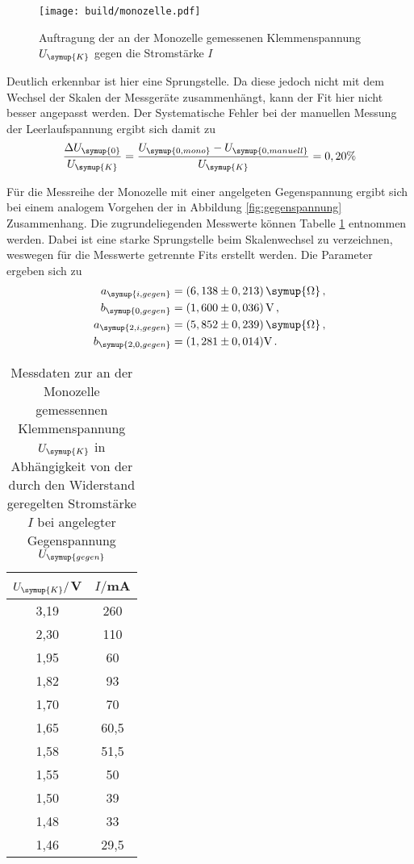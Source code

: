 \begin{figure}
  \centering
  \texttt{[image: build/monozelle.pdf]}
  \caption{Auftragung der an der Monozelle gemessenen Klemmenspannung $U_{\symup{K}}$
  gegen die Stromstärke $I$}
  \label{fig:monozelle}
\end{figure}

Deutlich erkennbar ist hier eine Sprungstelle. Da diese jedoch nicht mit dem Wechsel
der Skalen der Messgeräte zusammenhängt, kann der Fit hier nicht besser angepasst
werden.
Der Systematische Fehler bei der manuellen Messung der Leerlaufspannung ergibt
sich damit zu
\begin{equation}
  \frac{\Delta U_{\symup{0}}}{U_\symup{K}}=\frac{U_{\symup{0,mono}}-U_{\symup{0,manuell}}}
  {U_\symup{K}} = 0,20\%
\end{equation}

Für die Messreihe der Monozelle mit einer angelgeten Gegenspannung ergibt sich
bei einem analogem Vorgehen der in Abbildung \ref{fig:gegenspannung} Zusammenhang.
Die zugrundeliegenden Messwerte können Tabelle \ref{tab:gegenspannung} entnommen werden.
Dabei ist eine starke Sprungstelle beim Skalenwechsel zu verzeichnen, weswegen für
die Messwerte getrennte Fits erstellt werden. Die Parameter ergeben sich zu
\begin{align}
  a_{\symup{i,gegen}}&=(6,138\pm0,213)\,\symup{\Omega}\,,\\
  b_{\symup{0,gegen}}&=(1,600\pm0,036)\,\text{V}\,,\\
  a_{\symup{2,i,gegen}}&=(5,852\pm0,239)\,\symup{\Omega}\,,\\
  b_{\symup{2,0,gegen}}&=(1,281\pm0,014)\text{V}\,.
\end{align}

\begin{table}
  \centering
  \caption{Messdaten zur an der Monozelle gemessennen Klemmenspannung $U_{\symup{K}}$
  in Abhängigkeit von der durch den Widerstand geregelten Stromstärke $I$ bei angelegter
  Gegenspannung $U_{\symup{gegen}}$}
  \label{tab:gegenspannung}
  \begin{tabular}{c c}
    \toprule
    $U_{\symup{K}}/$V & $I/$mA\\
    \midrule
    3,19	&  260\\
    2,30	&  110\\
    1,95	&  60\\
    1,82	&  93\\
    1,70	&  70\\
    1,65	&  60,5\\
    1,58	&  51,5\\
    1,55	&  50\\
    1,50	&  39\\
    1,48	&  33\\
    1,46	&  29,5\\
    \bottomrule
  \end{tabular}
\end{table}

